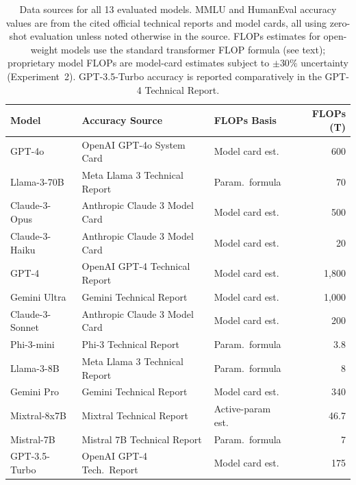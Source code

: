 \documentclass[12pt]{article}
\begin{document}
\begin{table}[H]
\centering
\small
\begin{tabular}{lp{4.2cm}p{2.4cm}r}
\toprule
\textbf{Model} & \textbf{Accuracy Source} & \textbf{FLOPs Basis} & \textbf{FLOPs (T)} \\
\midrule
GPT-4o         & OpenAI GPT-4o System Card \cite{openai2024gpt4o}           & Model card est. & 600 \\
Llama-3-70B    & Meta Llama 3 Technical Report \cite{meta2024llama3}         & Param.\ formula & 70 \\
Claude-3-Opus  & Anthropic Claude 3 Model Card \cite{anthropic2024claude3}   & Model card est. & 500 \\
Claude-3-Haiku & Anthropic Claude 3 Model Card \cite{anthropic2024claude3}   & Model card est. & 20 \\
GPT-4          & OpenAI GPT-4 Technical Report \cite{openai2023gpt4}         & Model card est. & 1{,}800 \\
Gemini Ultra   & Gemini Technical Report \cite{google2023gemini}             & Model card est. & 1{,}000 \\
Claude-3-Sonnet & Anthropic Claude 3 Model Card \cite{anthropic2024claude3}  & Model card est. & 200 \\
Phi-3-mini     & Phi-3 Technical Report \cite{microsoft2024phi3}             & Param.\ formula & 3.8 \\
Llama-3-8B     & Meta Llama 3 Technical Report \cite{meta2024llama3}         & Param.\ formula & 8 \\
Gemini Pro     & Gemini Technical Report \cite{google2023gemini}             & Model card est. & 340 \\
Mixtral-8x7B   & Mixtral Technical Report \cite{jiang2024mixtral}            & Active-param est. & 46.7 \\
Mistral-7B     & Mistral 7B Technical Report \cite{jiang2023mistral}         & Param.\ formula & 7 \\
GPT-3.5-Turbo  & OpenAI GPT-4 Tech.\ Report \cite{openai2023gpt4}           & Model card est. & 175 \\
\bottomrule
\end{tabular}
\caption{Data sources for all 13 evaluated models. MMLU and HumanEval accuracy values are from the cited official technical reports and model cards, all using zero-shot evaluation unless noted otherwise in the source. FLOPs estimates for open-weight models use the standard transformer FLOP formula (see text); proprietary model FLOPs are model-card estimates subject to $\pm 30\%$ uncertainty (Experiment~2). GPT-3.5-Turbo accuracy is reported comparatively in the GPT-4 Technical Report.}
\label{tab:data-sources}
\end{table}
\end{document}
